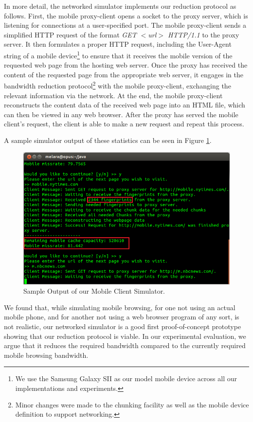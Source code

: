 In more detail, the networked simulator implements our reduction protocol as follows. First, the mobile proxy-client opens a socket to the proxy server, which is listening for connections at a user-specified port. The mobile proxy-client sends a simplified HTTP request of the format \emph{GET $<$url$>$ HTTP/1.1} to the proxy server. It then formulates a proper HTTP request, including the User-Agent string of a mobile device\footnote{We use the Samsung Galaxy SII as our model mobile device across all our implementations and experiments.} to ensure that it receives the mobile version of the requested web page from the hosting web server. Once the proxy has received the content of the requested page from the appropriate web server, it engages in the bandwidth reduction protocol\footnote{Minor changes were made to the chunking facility as well as the mobile device definition to support networking.} with the mobile proxy-client, exchanging the relevant information via the network. At the end, the mobile proxy-client reconstructs the content data of the received web page into an HTML file, which can then be viewed in any web browser. After the proxy has served the mobile client's request, the client is able to make a new request and repeat this process.

A sample simulator output of these statistics can be seen in Figure \ref{fig:mobsim_output}.

\begin{figure}[h] 
\centering \includegraphics[scale=0.40]{images/mobilesim_output.png}
\caption{Sample Output of our Mobile Client Simulator.}
\label{fig:mobsim_output}
\end{figure}

We found that, while simulating mobile browsing, for one not using an actual mobile phone, and for another not using a web browser program of any sort, is not realistic, our networked simulator is a good first proof-of-concept prototype showing that our reduction protocol is viable. In our experimental evaluation, we argue that it reduces the required bandwidth compared to the currently required mobile browsing bandwidth.

